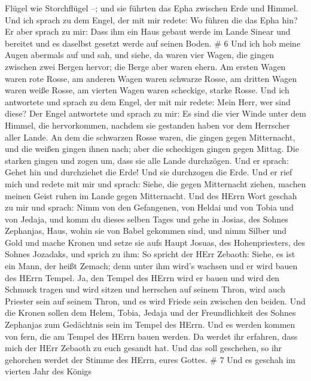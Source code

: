 Flügel wie Storchflügel --; und sie führten das Epha zwischen Erde und
Himmel.  Und ich sprach zu dem Engel, der mit mir redete:
Wo führen die das Epha hin?  Er aber sprach zu mir: Dass
ihm ein Haus gebaut werde im Lande Sinear und bereitet und es daselbst
gesetzt werde auf seinen Boden. \# 6  Und ich hob meine
Augen abermals auf und sah, und siehe, da waren vier Wagen, die gingen
zwischen zwei Bergen hervor; die Berge aber waren ehern.  Am
ersten Wagen waren rote Rosse, am anderen Wagen waren schwarze Rosse,
 am dritten Wagen waren weiße Rosse, am vierten Wagen waren
scheckige, starke Rosse.  Und ich antwortete und sprach zu
dem Engel, der mit mir redete: Mein Herr, wer sind diese? 
Der Engel antwortete und sprach zu mir: Es sind die vier Winde unter dem
Himmel, die hervorkommen, nachdem sie gestanden haben vor dem Herrscher
aller Lande.  An dem die schwarzen Rosse waren, die gingen
gegen Mitternacht, und die weißen gingen ihnen nach; aber die scheckigen
gingen gegen Mittag.  Die starken gingen und zogen um, dass
sie alle Lande durchzögen. Und er sprach: Gehet hin und durchziehet die
Erde! Und sie durchzogen die Erde.  Und er rief mich und
redete mit mir und sprach: Siehe, die gegen Mitternacht ziehen, machen
meinen Geist ruhen im Lande gegen Mitternacht.  Und des
HErrn Wort geschah zu mir und sprach:  Nimm von den
Gefangenen, von Heldai und von Tobia und von Jedaja, und komm du dieses
selben Tages und gehe in Josias, des Sohnes Zephanjas, Haus, wohin sie
von Babel gekommen sind,  und nimm Silber und Gold und
mache Kronen und setze sie aufs Haupt Josuas, des Hohenpriesters, des
Sohnes Jozadaks,  und sprich zu ihm: So spricht der HErr
Zebaoth: Siehe, es ist ein Mann, der heißt Zemach; denn unter ihm wird's
wachsen und er wird bauen des HErrn Tempel.  Ja, den Tempel
des HErrn wird er bauen und wird den Schmuck tragen und wird sitzen und
herrschen auf seinem Thron, wird auch Priester sein auf seinem Thron,
und es wird Friede sein zwischen den beiden.  Und die
Kronen sollen dem Helem, Tobia, Jedaja und der Freundlichkeit des Sohnes
Zephanjas zum Gedächtnis sein im Tempel des HErrn.  Und es
werden kommen von fern, die am Tempel des HErrn bauen werden. Da werdet
ihr erfahren, dass mich der HErr Zebaoth zu euch gesandt hat. Und das
soll geschehen, so ihr gehorchen werdet der Stimme des HErrn, eures
Gottes. \# 7  Und es geschah im vierten Jahr des Königs
